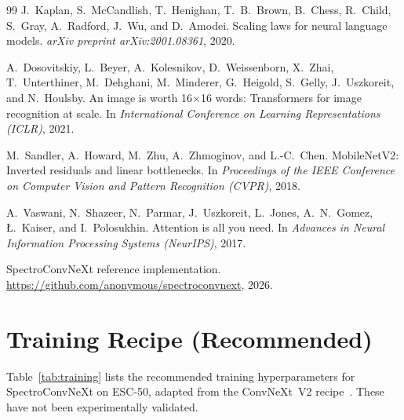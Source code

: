 \documentclass{article}
\begin{document}
{\begin{thebibliography}{99}
J.~Kaplan, S.~McCandlish, T.~Henighan, T.~B.~Brown, B.~Chess, R.~Child, S.~Gray,
A.~Radford, J.~Wu, and D.~Amodei.
Scaling laws for neural language models.
\emph{arXiv preprint arXiv:2001.08361}, 2020.

A.~Dosovitskiy, L.~Beyer, A.~Kolesnikov, D.~Weissenborn, X.~Zhai, T.~Unterthiner,
M.~Dehghani, M.~Minderer, G.~Heigold, S.~Gelly, J.~Uszkoreit, and N.~Houlsby.
An image is worth 16$\times$16 words: Transformers for image recognition at scale.
In \textit{International Conference on Learning Representations (ICLR)}, 2021.

M.~Sandler, A.~Howard, M.~Zhu, A.~Zhmoginov, and L.-C.~Chen.
MobileNetV2: Inverted residuals and linear bottlenecks.
In \textit{Proceedings of the IEEE Conference on Computer Vision and Pattern Recognition (CVPR)}, 2018.

A.~Vaswani, N.~Shazeer, N.~Parmar, J.~Uszkoreit, L.~Jones, A.~N.~Gomez,
{\L}.~Kaiser, and I.~Polosukhin.
Attention is all you need.
In \textit{Advances in Neural Information Processing Systems (NeurIPS)}, 2017.

SpectroConvNeXt reference implementation.
\url{https://github.com/anonymous/spectroconvnext}, 2026.

\end{thebibliography}
}

\appendix
\section{Training Recipe (Recommended)}

Table~\ref{tab:training} lists the recommended training hyperparameters for
SpectroConvNeXt on ESC-50, adapted from the ConvNeXt~V2
recipe~\citep{woo2023convnextv2}. These have not been experimentally validated.
\end{document}
